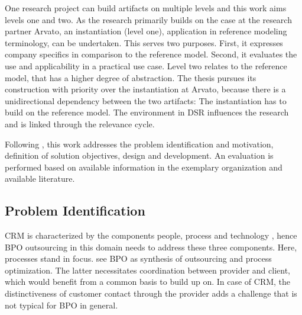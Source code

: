 One research project can build artifacts on multiple levels \citep{gregor2013positioning} and this work aims levels one and two. As the research primarily builds on the case at the research partner Arvato, an instantiation (level one), \viz application in reference modeling terminology, can be undertaken. This serves two purposes. First, it expresses company specifics in comparison to the reference model. Second, it evaluates the use and applicability in a practical use case.  Level two relates to the reference model, that has a higher degree of abstraction. The thesis pursues its construction with priority over the instantiation at Arvato, because there is a unidirectional dependency between the two artifacts: The instantiation has to build on the reference model. The environment in \acrshort{DSR} influences the research and is linked through the relevance cycle. 

Following \citeauthor{Hevner2004,Peffers2007}, this work addresses the problem identification and motivation, definition of solution objectives,  design and development. An evaluation is performed based on available information in the exemplary organization and available literature. 



\subsection{Problem Identification}
CRM is characterized by the components people, process and technology \citep{Chen_2003}, hence BPO outsourcing in this domain needs to address these three components. Here, processes stand in focus.  \cite{schewe2007} see BPO as synthesis of outsourcing and process optimization. The latter necessitates coordination between provider and client, which would benefit from a common basis to build up on. In case of CRM, the distinctiveness of customer contact through the provider adds a challenge that is not typical for BPO in general. 

